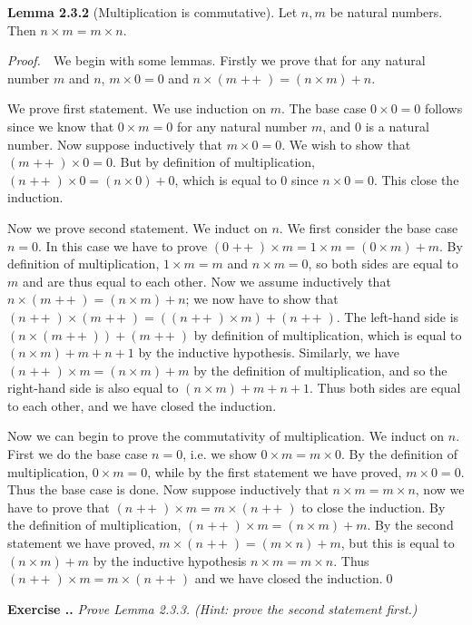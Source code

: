 \documentclass{book}
\DeclareMathOperator{\tadd}{+\!+}%
\newcommand{\pff}{\vspace{.25em}\noindent\emph{Proof.}~~}
\newcommand{\titl}[1]{\noindent\textbf{#1}}
\newcounter{Exercise}[section]
\renewcommand{\theExercise}{\thesection.\arabic{Exercise}.}
\newcommand{\new}{\vspace{1.5em}\noindent\textbf{{Exercise \stepcounter{Exercise}\textbf{\theExercise}}} }
\begin{document}
\begin{framed}
\titl{Lemma 2.3.2} (Multiplication is commutative). Let $n,m$ be natural numbers. Then $n\times m=m\times n$.
\end{framed}

\pff We begin with some lemmas. Firstly we prove that for any natural number $m$ and $n$, $m\times 0=0$ and $n\times(m\tadd)=(n\times m)+n$.

We prove first statement. We use induction on $m$. The base case $0\times 0=0$ follows since we know that $0\times m=0$ for any natural number $m$, and $0$ is a natural number. Now suppose inductively that $m\times 0=0$. We wish to show that $(m\tadd)\times 0=0$. But by definition of multiplication, $(n\tadd)\times 0=(n\times 0)+0$, which is equal to $0$ since $n\times 0=0$. This close the induction.

Now we prove second statement. We induct on $n$. We first consider the base case $n=0$. In this case we have to prove $(0\tadd)\times m=1\times m=(0\times m)+m$. By definition of multiplication, $1\times m=m$ and $n\times m=0$, so both sides are equal to $m$ and are thus equal to each other. Now we assume inductively that $n\times(m\tadd)=(n\times m)+n$; we now have to show that $(n\tadd)\times(m\tadd)=((n\tadd)\times m)+(n\tadd)$. The left-hand side is $(n\times(m\tadd))+(m\tadd)$ by definition of multiplication, which is equal to $(n\times m)+m+n+1$ by the inductive hypothesis. Similarly, we have $(n\tadd)\times m=(n\times m)+m$ by the definition of multiplication, and so the right-hand side is also equal to $(n\times m)+m+n+1$. Thus both sides are equal to each other, and we have closed the induction.

Now we can begin to prove the commutativity of multiplication. We induct on $n$. First we do the base case $n=0$, i.e. we show $0\times m=m\times 0$. By the definition of multiplication, $0\times m=0$, while by the first statement we have proved, $m\times 0=0$. Thus the base case is done. Now suppose inductively that $n\times m=m\times n$, now we have to prove that $(n\tadd)\times m=m\times(n\tadd)$ to close the induction. By the definition of multiplication, $(n\tadd)\times m=(n\times m)+m$. By the second statement we have proved, $m\times(n\tadd)=(m\times n)+m$, but this is equal to $(n\times m)+m$ by the inductive hypothesis $n\times m=m\times n$. Thus $(n\tadd)\times m=m\times(n\tadd)$ and we have closed the induction.\qed

\new\emph{Prove Lemma 2.3.3. (Hint: prove the second statement first.)}
\end{document}
